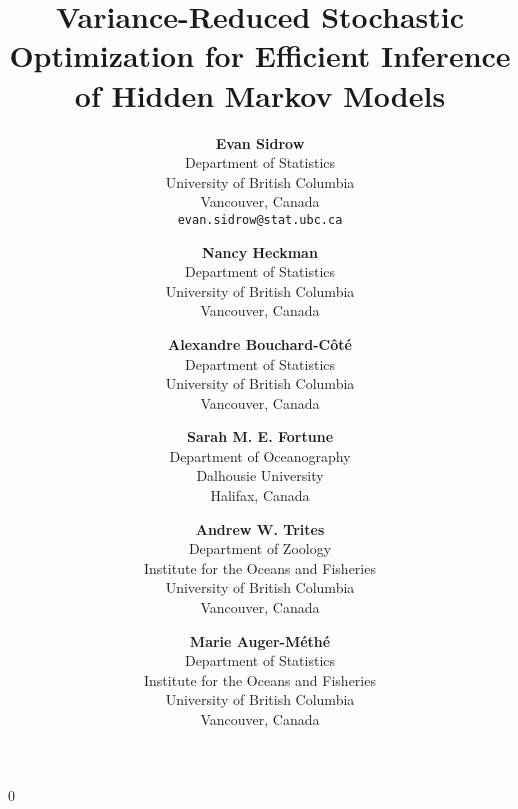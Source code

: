 \documentclass[11pt]{article}
\date{}
\newcommand{\blind}{0}
\begin{document}
%

\def\spacingset#1{\renewcommand{\baselinestretch}%
{#1}\small\normalsize} \spacingset{1}


\blind
{
    \title{Variance-Reduced Stochastic Optimization for Efficient Inference of Hidden Markov Models}

    \author{
      \textbf{Evan Sidrow} \\
      Department of Statistics \\
      University of British Columbia\\
      Vancouver, Canada \\
      \texttt{evan.sidrow@stat.ubc.ca} \\
      \and
      \textbf{Nancy Heckman} \\
      Department of Statistics \\
      University of British Columbia \\
      Vancouver, Canada \\
      \and
      \textbf{Alexandre Bouchard-C\^ot\'e} \\
      Department of Statistics \\
      University of British Columbia \\
      Vancouver, Canada \\
      \and
      \textbf{Sarah M. E. Fortune} \\
      Department of Oceanography \\
      Dalhousie University \\
      Halifax, Canada \\
      \and
      \textbf{Andrew W. Trites} \\
      Department of Zoology \\
      Institute for the Oceans and Fisheries \\
      University of British Columbia \\
      Vancouver, Canada \\
      \and
      \textbf{Marie Auger-M\'eth\'e} \\
      Department of Statistics \\
      Institute for the Oceans and Fisheries \\
      University of British Columbia \\
      Vancouver, Canada \\
    }
    \maketitle
} \fi
\end{document}
